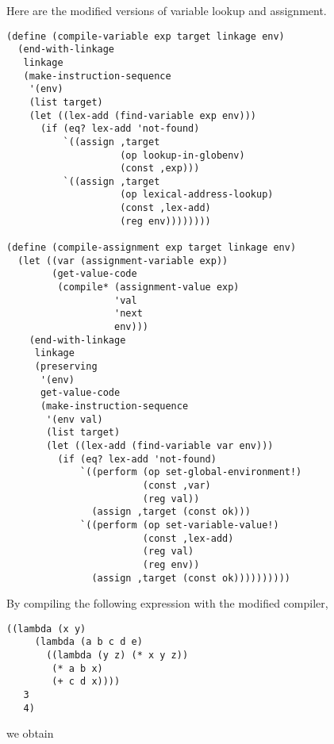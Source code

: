 \documentclass[a4paper,12pt]{article}
\begin{document}
Here are the modified versions of variable lookup and assignment.

\begin{lstlisting}
(define (compile-variable exp target linkage env)
  (end-with-linkage
   linkage
   (make-instruction-sequence
    '(env)
    (list target)
    (let ((lex-add (find-variable exp env)))
      (if (eq? lex-add 'not-found)
          `((assign ,target
                    (op lookup-in-globenv)
                    (const ,exp)))
          `((assign ,target
                    (op lexical-address-lookup)
                    (const ,lex-add)
                    (reg env))))))))

(define (compile-assignment exp target linkage env)
  (let ((var (assignment-variable exp))
        (get-value-code
         (compile* (assignment-value exp)
                   'val
                   'next
                   env)))
    (end-with-linkage
     linkage
     (preserving
      '(env)
      get-value-code
      (make-instruction-sequence
       '(env val)
       (list target)
       (let ((lex-add (find-variable var env)))
         (if (eq? lex-add 'not-found)
             `((perform (op set-global-environment!)
                        (const ,var)
                        (reg val))
               (assign ,target (const ok)))
             `((perform (op set-variable-value!)
                        (const ,lex-add)
                        (reg val)
                        (reg env))
               (assign ,target (const ok))))))))))
\end{lstlisting}

By compiling the following expression with the modified compiler,
\begin{lstlisting}
((lambda (x y)
     (lambda (a b c d e)
       ((lambda (y z) (* x y z))
        (* a b x)
        (+ c d x))))
   3
   4)
\end{lstlisting}

we obtain
\end{document}
